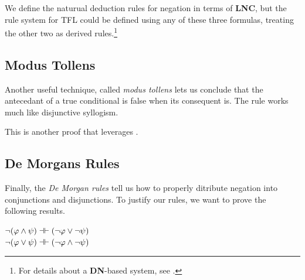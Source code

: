 We define the naturual deduction rules for negation in terms of \textbf{LNC},
but the rule system for TFL could be defined using any of these three
formulas, treating the other two as derived rules.\footnote{For details about
a \textbf{DN}-based system, see \cite[][]{Smi20}.}

\subsection{Modus Tollens}

Another useful technique, called \emph{modus tollens} lets us conclude that
the antecedant of a true conditional is false when its consequent is. The
rule works much like disjunctive syllogism.

\begin{fitchrule}
  \label{def:modus-tollens-rule}
  \leavevmode
  \vspace{-0.9\baselineskip}
  \begin{fitchproof}
     {\ephi\eif\epsi}
     {\enot\epsi}
     {\enot\ephi}     
  \end{fitchproof}
\end{fitchrule}

This is another proof that leverages \ebot.

\begin{fitchproof}
   {\ephi\eif\epsi}  
   {\enot\epsi}      
  \open
   {\ephi}           
   {\epsi}           
   {\ebot}           
  \close
   {\enot\ephi}      
\end{fitchproof}

\subsection{De Morgans Rules}

Finally, the \emph{De Morgan rules} tell us how to properly ditribute negation
into conjunctions and disjunctions. To justify our rules, we want to prove the
following results.

\begin{center}
  \textbf{\enot\eand}
  $\neg(\varphi\wedge\psi)\dashv\vdash(\neg\varphi\vee\neg\psi)$ \\
  \textbf{\enot\eor}
  $\neg(\varphi\vee\psi)\dashv\vdash(\neg\varphi\wedge\neg\psi)$
\end{center}

